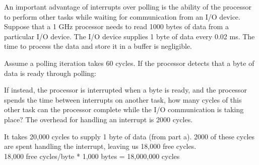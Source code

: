 \begin{blocksection}
An important advantage of interrupts over polling is the ability of the processor to perform other tasks while waiting for communication from an I/O device. Suppose that a 1 GHz processor needs to read 1000 bytes of data from a particular I/O device. The I/O device supplies 1 byte of data every 0.02 ms. The time to process the data and store it in a buffer is negligible.

\question 
Assume a polling iteration takes 60 cycles. If the processor detects that a byte of data is ready through polling:

\question
If instead, the processor is interrupted when a byte is ready, and the processor spends the time between interrupts on another task, how many cycles of this other task can the processor complete while the I/O communication is taking place? The overhead for handling an interrupt is 2000 cycles. 

\begin{solution}[0.5in]
It takes 20,000 cycles to supply 1 byte of data (from part a). 2000 of these cycles are spent handling the interrupt, leaving us 18,000 free cycles. \\
18,000 free cycles/byte * 1,000 bytes = 18,000,000 cycles
\end{solution}


\end{blocksection}
